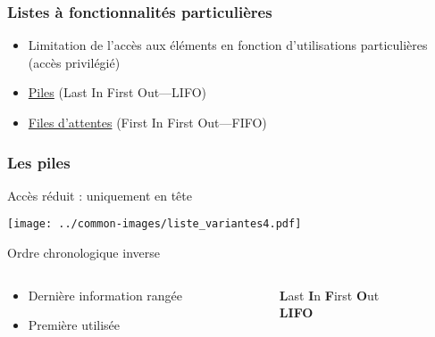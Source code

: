\documentclass[table,handout,tikz,12pt,svgnames]{beamer}
\begin{document}
\begin{frame}[fragile=singleslide]
	\frametitle{Listes à fonctionnalités particulières}
	\begin{block}{}
		\begin{itemize}
			\item Limitation de l'accès aux éléments en fonction d'utilisations particulières (accès privilégié)
			\item \underline{Piles} (Last In First Out---LIFO)
			\item \underline{Files d'attentes} (First In First Out---FIFO)
		\end{itemize}
	\end{block}
\end{frame}


\begin{frame}[fragile=singleslide]
	\frametitle{Les piles}
	\begin{block}{Accès réduit : uniquement en tête}
		\begin{center}
			{\texttt{[image: ../common-images/liste\_variantes4.pdf]}}
		\end{center}		
	\end{block}
	\vspace{-0.7cm}
	\begin{block}{Ordre chronologique inverse}
		\begin{columns}[c]
			\hspace{-0.5cm}
			\begin{column}{0.7\textwidth}
				\begin{itemize}
					\item Dernière information rangée
					\item Première utilisée
				\end{itemize}
			\end{column}
			\hspace{-1.3cm}
			\vrule{}
			\hspace{0.3cm}
			\begin{column}{0.38\textwidth}
				\begin{center}
					\textbf{L}ast \textbf{I}n \textbf{F}irst \textbf{O}ut\\ \textbf{LIFO}
				\end{center}
			\end{column}
		\end{columns}
	\end{block}
\end{frame}
\end{document}
